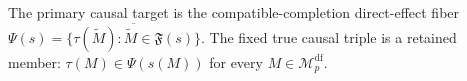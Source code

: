 The primary causal target is the compatible-completion direct-effect fiber \(\Psi(s)=\overline{\{\tau(\widetilde M):\widetilde M\in\mathfrak F(s)\}}\). The fixed true causal triple is a retained member: \(\tau(M)\in\Psi(s(M))\) for every \(M\in\mathcal M_p^{\mathrm{df}}\).